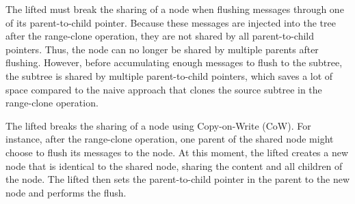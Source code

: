 The lifted \bedag must break the sharing of a node when flushing messages
through one of its parent-to-child pointer.
Because these messages are injected into the tree after the range-clone
operation, they are not shared by all parent-to-child pointers.
Thus, the node can no longer be shared by multiple parents after flushing.
However, before accumulating enough messages to flush to the subtree,
the subtree is shared by multiple parent-to-child pointers,
which saves a lot of space compared to the naive approach that clones
the source subtree in the range-clone operation.

The lifted \bedag breaks the sharing of a node using Copy-on-Write (CoW).
For instance, after the range-clone operation, one parent of the shared node
might choose to flush its messages to the node.
At this moment, the lifted \bedag creates a new node that is identical to the
shared node, sharing the content and all children of the node.
The lifted \bedag then sets the parent-to-child pointer in the parent to the new
node and performs the flush.

